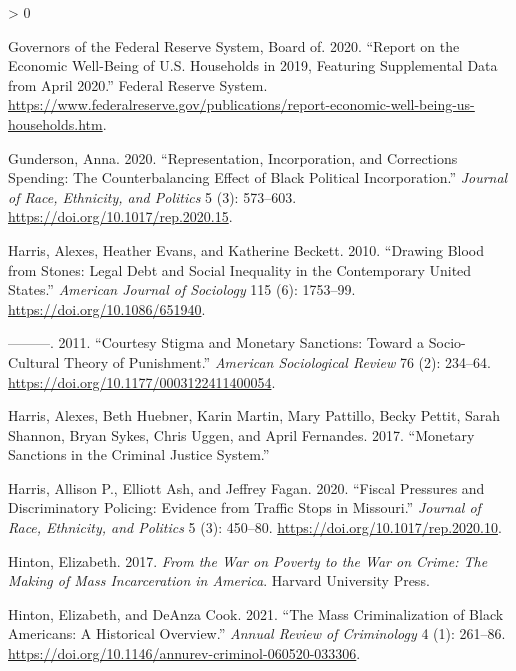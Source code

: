 \documentclass[
  12pt,
]{article}
\newlength{\cslhangindent}
\newenvironment{CSLReferences}[2] %
 {%
  \setlength{\parindent}{0pt}
  \ifodd #1 \everypar{\setlength{\hangindent}{\cslhangindent}}\ignorespaces\fi
  \ifnum #2 > 0
  \setlength{\parskip}{#2\baselineskip}
  \fi
 }%
 {}
\begin{document}
\begin{CSLReferences}{1}{0}
\leavevmode\hypertarget{ref-BoardofGovernorsoftheFederalReserveSystem2020}{}%
Governors of the Federal Reserve System, Board of. 2020. {``Report on the {Economic Well}-{Being} of {U}.{S}. {Households} in 2019, {Featuring Supplemental Data} from {April} 2020.''} {Federal Reserve System}. \url{https://www.federalreserve.gov/publications/report-economic-well-being-us-households.htm}.

\leavevmode\hypertarget{ref-Gunderson2020}{}%
Gunderson, Anna. 2020. {``Representation, {Incorporation}, and {Corrections Spending}: {The Counterbalancing Effect} of {Black Political Incorporation}.''} \emph{Journal of Race, Ethnicity, and Politics} 5 (3): 573--603. \url{https://doi.org/10.1017/rep.2020.15}.

\leavevmode\hypertarget{ref-Harris2010}{}%
Harris, Alexes, Heather Evans, and Katherine Beckett. 2010. {``Drawing {Blood} from {Stones}: {Legal Debt} and {Social Inequality} in the {Contemporary United States}.''} \emph{American Journal of Sociology} 115 (6): 1753--99. \url{https://doi.org/10.1086/651940}.

\leavevmode\hypertarget{ref-Harris2011}{}%
---------. 2011. {``Courtesy {Stigma} and {Monetary Sanctions}: {Toward} a {Socio}-{Cultural Theory} of {Punishment}.''} \emph{American Sociological Review} 76 (2): 234--64. \url{https://doi.org/10.1177/0003122411400054}.

\leavevmode\hypertarget{ref-Harris2017}{}%
Harris, Alexes, Beth Huebner, Karin Martin, Mary Pattillo, Becky Pettit, Sarah Shannon, Bryan Sykes, Chris Uggen, and April Fernandes. 2017. {``Monetary {Sanctions} in the {Criminal Justice System}.''}

\leavevmode\hypertarget{ref-Harris2020}{}%
Harris, Allison P., Elliott Ash, and Jeffrey Fagan. 2020. {``Fiscal {Pressures} and {Discriminatory Policing}: {Evidence} from {Traffic Stops} in {Missouri}.''} \emph{Journal of Race, Ethnicity, and Politics} 5 (3): 450--80. \url{https://doi.org/10.1017/rep.2020.10}.

\leavevmode\hypertarget{ref-Hinton2017}{}%
Hinton, Elizabeth. 2017. \emph{From the {War} on {Poverty} to the {War} on {Crime}: {The Making} of {Mass Incarceration} in {America}}. {Harvard University Press}.

\leavevmode\hypertarget{ref-Hinton2021}{}%
Hinton, Elizabeth, and DeAnza Cook. 2021. {``The {Mass Criminalization} of {Black Americans}: {A Historical Overview}.''} \emph{Annual Review of Criminology} 4 (1): 261--86. \url{https://doi.org/10.1146/annurev-criminol-060520-033306}.


\end{CSLReferences}
\end{document}
